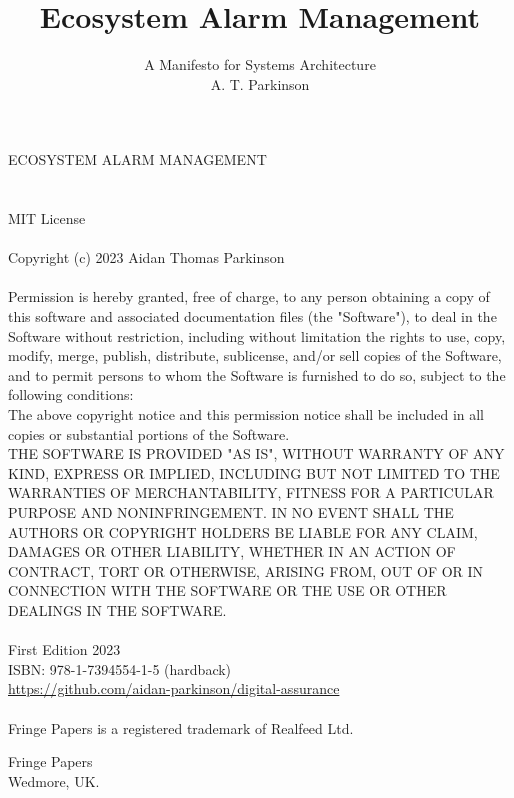 \documentclass[11pt, oneside]{article}   	%
\title{Ecosystem Alarm Management}
\author{\Large A Manifesto for Systems Architecture\\
\large A. T. Parkinson}
\date{}						%
\begin{document}

\begin{center}
\vspace*{50mm}
ECOSYSTEM ALARM MANAGEMENT
\end{center}

\pagebreak

\section*{}
\begin{small}
	MIT License\\
	\\
	Copyright (c) 2023 Aidan Thomas Parkinson\\
	\\
	Permission is hereby granted, free of charge, to any person obtaining a copy of this software and associated documentation files (the "Software"), to deal in the Software without restriction, including without limitation the rights to use, copy, modify, merge, publish, distribute, sublicense, and/or sell copies of the Software, and to permit persons to whom the Software is furnished to do so, subject to the following conditions:\\
	The above copyright notice and this permission notice shall be included in all copies or substantial portions of the Software.\\
	THE SOFTWARE IS PROVIDED "AS IS", WITHOUT WARRANTY OF ANY KIND, EXPRESS OR IMPLIED, INCLUDING BUT NOT LIMITED TO THE WARRANTIES OF MERCHANTABILITY, FITNESS FOR A PARTICULAR PURPOSE AND NONINFRINGEMENT. IN NO EVENT SHALL THE AUTHORS OR COPYRIGHT HOLDERS BE LIABLE FOR ANY CLAIM, DAMAGES OR OTHER LIABILITY, WHETHER IN AN ACTION OF CONTRACT, TORT OR OTHERWISE, ARISING FROM, OUT OF OR IN CONNECTION WITH THE SOFTWARE OR THE USE OR OTHER DEALINGS IN THE SOFTWARE.\\
	\\
	First Edition 2023\\
	ISBN: 978-1-7394554-1-5 (hardback)\\
	\url{https://github.com/aidan-parkinson/digital-assurance}\\
	\\
	Fringe Papers is a registered trademark of Realfeed Ltd.
\end{small}

\maketitle
\vfill
\begin{center}
Fringe Papers\\
Wedmore, UK.
\end{center}
\end{document}
